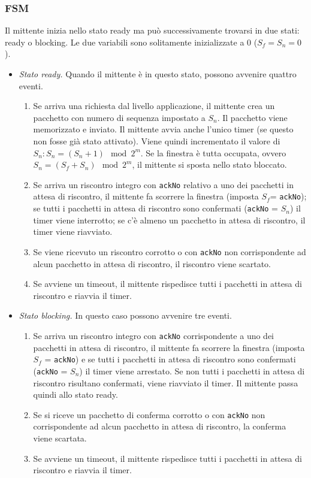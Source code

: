 \subsubsection*{FSM}
Il mittente inizia nello stato ready ma può successivamente trovarsi in due stati: ready o blocking. Le due variabili sono solitamente inizializzate a 0 ($S_f= S_n = 0$).
\begin{itemize}
    \item \textit{Stato ready.} Quando il mittente è in questo stato, possono avvenire quattro eventi.
    \begin{enumerate}
        \item Se arriva una richiesta dal livello applicazione, il mittente crea un pacchetto con numero di sequenza impostato a $S_n$. Il pacchetto viene memorizzato e inviato. Il mittente avvia anche l'unico timer (se questo non fosse già stato attivato). Viene quindi incrementato il valore di $S_n: S_n = (S_n+1) \mod 2^m$. Se la finestra è tutta occupata, ovvero $S_n=(S_f+S_n) \mod 2^m$, il mittente si sposta nello stato bloccato.
        \item Se arriva un riscontro integro con \verb|ackNo| relativo a uno dei pacchetti in attesa di riscontro, il mittente fa scorrere la finestra (imposta $S_f$= \verb|ackNo|); se tutti i pacchetti in attesa di riscontro sono confermati (\verb|ackNo| = $S_n$) il timer viene interrotto; se c'è almeno un pacchetto in attesa di riscontro, il timer viene riavviato.
        \item Se viene ricevuto un riscontro corrotto o con \verb|ackNo| non corrispondente ad alcun pacchetto in attesa di riscontro, il riscontro viene scartato.
        \item Se avviene un timeout, il mittente rispedisce tutti i pacchetti in attesa di riscontro e riavvia il timer.
    \end{enumerate}
    \item \textit{Stato blocking.} In questo caso possono avvenire tre eventi.
    \begin{enumerate}
        \item Se arriva un riscontro integro con \verb|ackNo| corrispondente a uno dei pacchetti in attesa di riscontro, il mittente fa scorrere la finestra (imposta $S_f$ = \verb|ackNo|) e se tutti i pacchetti in attesa di riscontro sono confermati (\verb|ackNo| = $S_n$) il timer viene arrestato. Se non tutti i pacchetti in attesa di riscontro risultano confermati, viene riavviato il timer. Il mittente passa quindi allo stato ready.
        \item Se si riceve un pacchetto di conferma corrotto o con \verb|ackNo| non corrispondente ad alcun pacchetto in attesa di riscontro, la conferma viene scartata.
        \item Se avviene un timeout, il mittente rispedisce tutti i pacchetti in attesa di riscontro e riavvia il timer.
    \end{enumerate}
\end{itemize}

